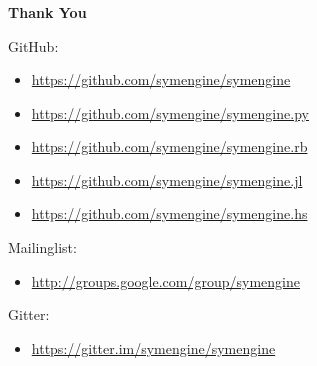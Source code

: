 \documentclass{beamer}
\begin{document}
\begin{frame}
\frametitle{}
{\Large\bf Thank You}
\medskip

GitHub:
\begin{itemize}
\item \href{https://github.com/symengine/symengine}{https://github.com/symengine/symengine}
\item \href{https://github.com/symengine/symengine.py}{https://github.com/symengine/symengine.py}
\item \href{https://github.com/symengine/symengine.rb}{https://github.com/symengine/symengine.rb}
\item \href{https://github.com/symengine/symengine.jl}{https://github.com/symengine/symengine.jl}
\item \href{https://github.com/symengine/symengine.hs}{https://github.com/symengine/symengine.hs}
\end{itemize}
Mailinglist:
\begin{itemize}
\item \href{http://groups.google.com/group/symengine}{http://groups.google.com/group/symengine}
\end{itemize}
Gitter:
\begin{itemize}
\item \href{https://gitter.im/symengine/symengine}{https://gitter.im/symengine/symengine}
\end{itemize}
\end{frame}
\end{document}

